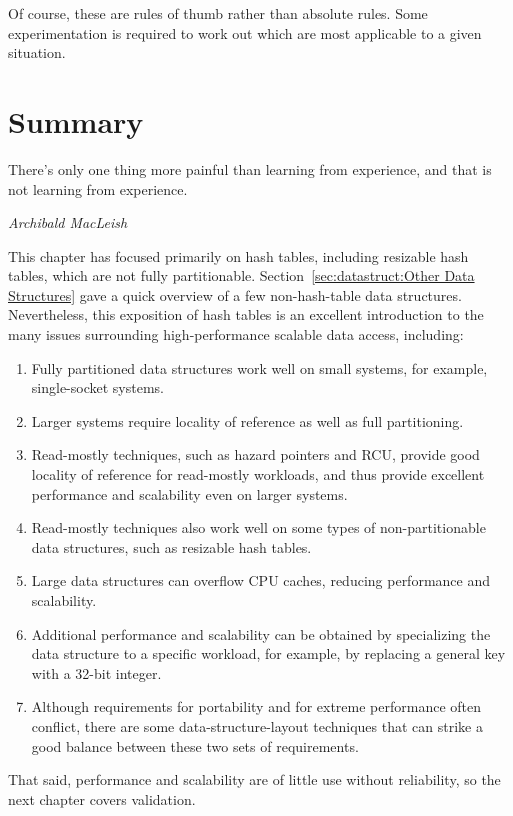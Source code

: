 Of course, these are rules of thumb rather than absolute rules.
Some experimentation is required to work out which are most applicable
to a given situation.

\section{Summary}
\label{sec:datastruct:Summary}
%
\epigraph{There's only one thing more painful than learning from
	  experience, and that is not learning from experience.}
	 {\emph{Archibald MacLeish}}

This chapter has focused primarily on hash tables, including resizable
hash tables, which are not fully partitionable.
Section~\ref{sec:datastruct:Other Data Structures} gave a quick
overview of a few non-hash-table data structures.
Nevertheless, this exposition of hash tables is an excellent introduction
to the many issues surrounding high-performance scalable data access,
including:

\begin{enumerate}
\item	Fully partitioned data structures work well on small systems,
	for example, single-socket systems.
\item	Larger systems require locality of reference as well as
	full partitioning.
\item	Read-mostly techniques, such as hazard pointers and RCU,
	provide good locality of reference for read-mostly workloads,
	and thus provide excellent performance and scalability even
	on larger systems.
\item	Read-mostly techniques also work well on some types of
	non-partitionable data structures, such as resizable hash tables.
\item	Large data structures can overflow CPU caches, reducing performance
	and scalability.
\item	Additional performance and scalability can be obtained by
	specializing the data structure to a specific workload,
	for example, by replacing a general key with a 32-bit integer.
\item	Although requirements for portability and for extreme performance
	often conflict, there are some data-structure-layout techniques
	that can strike a good balance between these two sets of
	requirements.
\end{enumerate}

That said, performance and scalability are of little use without reliability,
so the next chapter covers validation.

